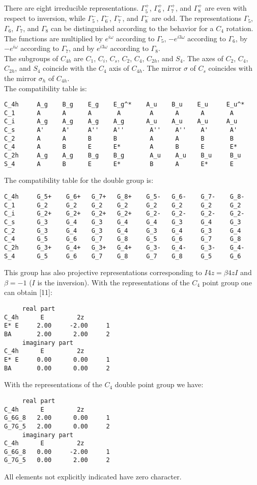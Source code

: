 \documentclass[12pt,a4paper]{article}
\begin{document}
There are eight irreducible representations. $\Gamma_5^+$, $\Gamma_6^+$,
$\Gamma_7^+$, and $\Gamma_8^+$ are even with respect to inversion, while
$\Gamma_5^-$, $\Gamma_6^-$, $\Gamma_7^-$, and $\Gamma_8^-$ are odd.
The representations $\Gamma_5$, $\Gamma_6$, $\Gamma_7$, and $\Gamma_8$ can
be distinguished according to the behavior for a $C_4$ rotation. The
functions are multiplied by $e^{i\omega}$ according to $\Gamma_5$,
$-e^{i3\omega}$ according to $\Gamma_6$, by $-e^{i\omega}$ according to
$\Gamma_7$, and by $e^{i3\omega}$ according to $\Gamma_8$.\\
The subgroups of $C_{4h}$ are $C_1$, $C_i$, $C_s$, $C_2$, $C_4$, $C_{2h}$,
and $S_4$.  The axes of $C_2$, $C_4$, $C_{2h}$, and $S_4$
coincide with the $C_4$ axis of $C_{4h}$.
The mirror $\sigma$ of $C_s$ coincides with the mirror $\sigma_h$ of $C_{4h}$. \\
The compatibility table is:
\begin{verbatim}
C_4h     A_g    B_g    E_g    E_g^*    A_u    B_u    E_u     E_u^*
C_1      A      A      A       A        A      A      A       A
C_i      A_g    A_g    A_g    A_g      A_u    A_u    A_u     A_u
C_s      A'     A'     A''    A''       A''    A''    A'      A'
C_2      A      A      B      B         A      A      B       B
C_4      A      B      E      E*        A      B      E       E*
C_2h     A_g    A_g    B_g    B_g       A_u    A_u    B_u     B_u
S_4      A      B      E      E*        B      A      E*      E 
\end{verbatim}
The compatibility table for the double group is:
\begin{verbatim}
C_4h     G_5+    G_6+   G_7+   G_8+    G_5-   G_6-    G_7-    G_8-
C_1      G_2     G_2    G_2    G_2     G_2    G_2     G_2     G_2
C_i      G_2+    G_2+   G_2+   G_2+    G_2-   G_2-    G_2-    G_2-     
C_s      G_3     G_4    G_3    G_4     G_4    G_3     G_4     G_3
C_2      G_3     G_4    G_3    G_4     G_3    G_4     G_3     G_4
C_4      G_5     G_6    G_7    G_8     G_5    G_6     G_7     G_8
C_2h     G_3+    G_4+   G_3+   G_4+    G_3-   G_4-    G_3-    G_4-
S_4      G_5     G_6    G_7    G_8     G_7    G_8     G_5     G_6
\end{verbatim}
This group has also projective representations corresponding to
$I 4z = \beta 4z I$ and $\beta=-1$ ($I$ is the inversion).
With the representations of the $C_4$ point group one can obtain [11]:
\begin{verbatim}
     real part
C_4h      E         2z
E* E     2.00     -2.00     1
BA       2.00      2.00     2
     imaginary part
C_4h      E         2z
E* E     0.00      0.00     1
BA       0.00      0.00     2
\end{verbatim}
With the representations of the $C_4$ double point group we have:
\begin{verbatim}
     real part
C_4h      E         2z
G_6G_8   2.00      0.00     1
G_7G_5   2.00      0.00     2
     imaginary part
C_4h      E         2z
G_6G_8   0.00     -2.00     1
G_7G_5   0.00      2.00     2
\end{verbatim}
All elements not explicitly indicated have zero character.
\end{document}
